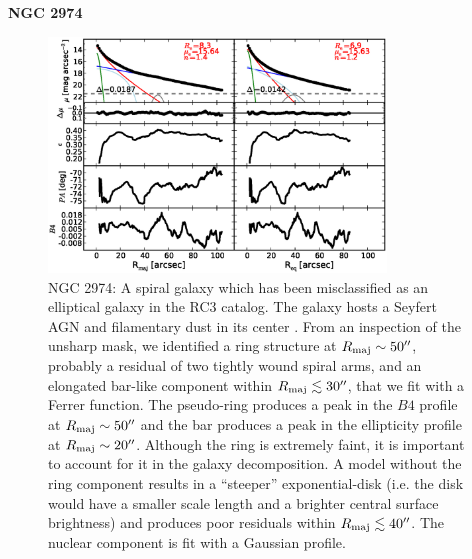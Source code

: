 \documentclass[preprint2]{emulateapj}
\newcommand{\fitfigurewidth}{0.8\textwidth}
\begin{document}
  \clearpage\newpage\noindent
  {\bf NGC 2974 \\}

  \begin{figure}[h]
  \begin{center}
  \includegraphics[width=\fitfigurewidth]{n2974_1Dfit.eps}
  \caption{NGC 2974: 
  A spiral galaxy which has been misclassified as an elliptical galaxy in the RC3 catalog.
  The galaxy hosts a Seyfert AGN \citep{veroncettyveron2006} and filamentary dust in its center \citep{tran2001}.
  From an inspection of the unsharp mask, we identified a ring structure at $R_{\rm maj} \sim 50''$, 
  probably a residual of two tightly wound spiral arms,
  and an elongated bar-like component within $R_{\rm maj} \lesssim 30''$, that we fit with a Ferrer function.
  The pseudo-ring produces a peak in the $B4$ profile at $R_{\rm maj} \sim 50''$ and 
  the bar produces a peak in the ellipticity profile at $R_{\rm maj} \sim 20''$.
  Although the ring is extremely faint, it is important to account for it in the galaxy decomposition. 
  A model without the ring component results in a ``steeper'' exponential-disk (i.e. the disk would have a smaller scale length 
  and a brighter central surface brightness) and produces poor residuals within $R_{\rm maj} \lesssim 40''$.
  The nuclear component is fit with a Gaussian profile.
  }
  \end{center}
  \end{figure}
\end{document}
